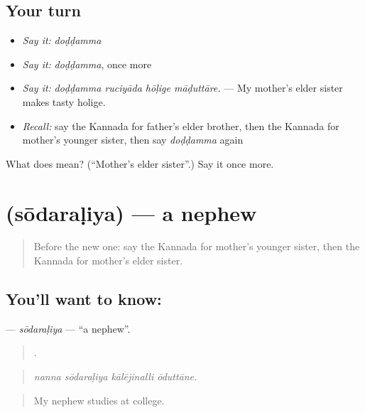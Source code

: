 \subsection*{Your turn}
\begin{itemize}
\raggedright
  \item \emph{Say it:} \emph{doḍḍamma}
  \item \emph{Say it:} \emph{doḍḍamma}, once more
  \item \emph{Say it:} \emph{doḍḍamma ruciyāda hōḷige māḍuttāre.} — My mother's elder sister makes tasty holige.
  \item \emph{Recall:} say the Kannada for father's elder brother, then the Kannada for mother's younger sister, then say \emph{doḍḍamma} again
\end{itemize}

\begin{tcolorbox}[breakable,colback=teal!4,colframe=teal!35!black,title={Before you move on}]
What does  mean? (\textquotedblleft{}Mother's elder sister\textquotedblright{}.) Say it once more.
\end{tcolorbox}
\section[\texorpdfstring{\kn{ಸೋದರಳಿಯ} (sōdaraḷiya)}{ಸೋದರಳಿಯ (sōdaraḷiya)}]{ (sōdaraḷiya) — a nephew}

\label{lesson:KA-C524-sodaraliya}



\begin{quote}
Before the new one: say the Kannada for mother's younger sister, then the Kannada for mother's elder sister.
\end{quote}

\subsection*{You'll want to know: }
\textbf{} — \emph{sōdaraḷiya} — \textquotedblleft{}a nephew\textquotedblright{}.

\begin{quote}
   .
\end{quote}

\begin{quote}
\emph{nanna sōdaraḷiya kālējinalli ōduttāne.}
\end{quote}

\begin{quote}
My nephew studies at college.
\end{quote}

